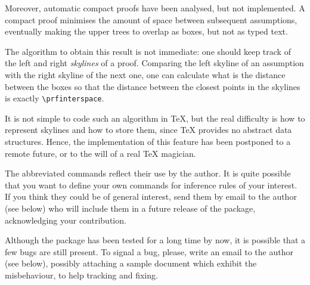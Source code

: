 \documentclass{amsart}
\begin{document}
Moreover, automatic compact proofs have been analysed, but not
implemented. A compact proof minimises the amount of space between
subsequent assumptions, eventually making the upper trees to overlap
as boxes, but not as typed text. 

The algorithm to obtain this result is not immediate: one should keep
track of the left and right \emph{skylines} of a proof. Comparing the
left skyline of an assumption with the right skyline of the next one,
one can calculate what is the distance between the boxes so that the
distance between the closest points in the skylines is exactly
\verb|\prfinterspace|. 

It is not simple to code such an algorithm in \TeX{}, but the real
difficulty is how to represent skylines and how to store them, since
\TeX{} provides no abstract data structures. Hence, the implementation
of this feature has been postponed to a remote future, or to the will
of a real \TeX{} magician.\vspace{2ex}

The abbreviated commands reflect their use by the author. It is quite
possible that you want to define your own commands for inference rules
of your interest. If you think they could be of general interest, send
them by email to the author (see below) who will include them in a
future release of the package, acknowledging your contribution.
\vfill

Although the package has been tested for a long time by now, it is
possible that a few bugs are still present. To signal a bug, please,
write an email to the author (see below), possibly attaching a sample
document which exhibit the misbehaviour, to help tracking and fixing.
\vfill
\end{document}
